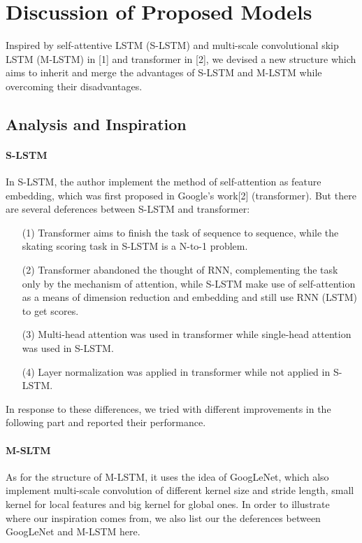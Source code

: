 \documentclass{article}
\begin{document}
\section{Discussion of Proposed Models}
Inspired by self-attentive LSTM (S-LSTM) and multi-scale convolutional skip LSTM (M-LSTM) in [1] and transformer in [2], we devised a new structure which aims to inherit and merge the advantages of S-LSTM and M-LSTM while overcoming their disadvantages.

\subsection{Analysis and Inspiration}
\label{analysis}
\paragraph*{S-LSTM} In S-LSTM, the author implement the method of self-attention as feature embedding, which was first proposed in Google's work[2] (transformer). But there are several deferences between S-LSTM and transformer:

\begin{itemize}
\item[(1)] Transformer aims to finish the task of sequence to sequence, while the skating scoring task in S-LSTM is a N-to-1 problem.
\item[(2)] Transformer abandoned the thought of RNN, complementing the task only by the mechanism of attention, while S-LSTM make use of self-attention as a means of dimension reduction and embedding and still use RNN (LSTM) to get scores.
\item[(3)] Multi-head attention was used in transformer while single-head attention was used in S-LSTM.
\item[(4)] Layer normalization was applied in transformer while not applied in S-LSTM.
\end{itemize}

In response to these differences, we tried with different improvements in the following part and reported their performance.

\paragraph*{M-SLTM} 
As for the structure of M-LSTM, it uses the idea of GoogLeNet, which also implement multi-scale convolution of different kernel size and stride length, small kernel for local features and big kernel for global ones. In order to illustrate where our inspiration comes from, we also list our the deferences between GoogLeNet and M-LSTM here.
\end{document}
